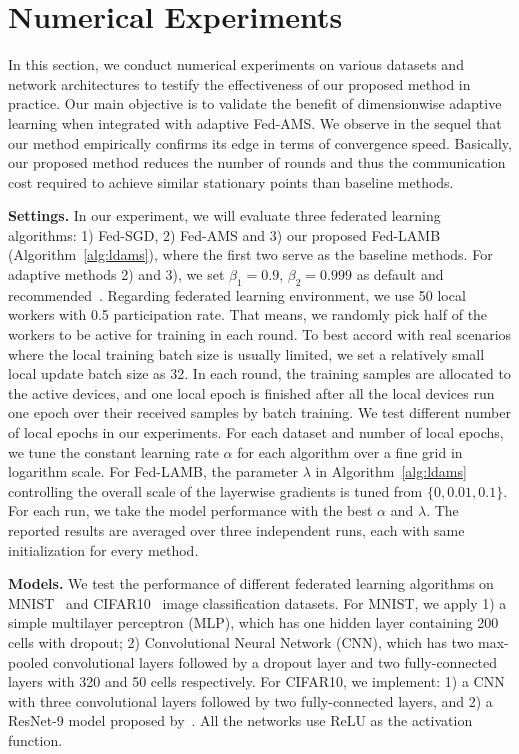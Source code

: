 \documentclass{article}
\begin{document}
\section{Numerical Experiments}\label{sec:numerical}

In this section, we conduct numerical experiments on various datasets and network architectures to testify the effectiveness of our proposed method in practice. Our main objective is to validate the benefit of dimensionwise adaptive learning when integrated with adaptive Fed-AMS.
We observe in the sequel that our method empirically confirms its edge in terms of convergence speed.
Basically, our proposed method reduces the number of rounds and thus the communication cost required to achieve similar stationary points than baseline methods. 

\medskip
\noindent\textbf{Settings.} In our experiment, we will evaluate three federated learning algorithms: 1) Fed-SGD, 2) Fed-AMS and 3) our proposed Fed-LAMB (Algorithm~\ref{alg:ldams}), where the first two serve as the baseline methods. For adaptive methods 2) and 3), we set $\beta_1=0.9$, $\beta_2=0.999$ as default and recommended~\citep{RKK18}. Regarding federated learning environment, we use 50 local workers with 0.5 participation rate. That means, we randomly pick half of the workers to be active for training in each round. To best accord with real scenarios where the local training batch size is usually limited, we set a relatively small local update batch size as 32. In each round, the training samples are allocated to the active devices, and one local epoch is finished after all the local devices run one epoch over their received samples by batch training. We test different number of local epochs in our experiments. For each dataset and number of local epochs, we tune the constant learning rate $\alpha$ for each algorithm over a fine grid in logarithm scale. For Fed-LAMB, the parameter $\lambda$ in Algorithm~\ref{alg:ldams} controlling the overall scale of the layerwise gradients is tuned from $\{0,0.01,0.1\}$. For each run, we take the model performance with the best $\alpha$ and $\lambda$. The reported results are averaged over three independent runs, each with same initialization for every method.

\medskip
\noindent\textbf{Models.} We test the performance of different federated learning algorithms on MNIST~\citep{lecun1998mnist} and CIFAR10~\citep{krizhevsky2009learning} image classification datasets. For MNIST, we apply 1) a simple multilayer perceptron (MLP), which has one hidden layer containing 200 cells with dropout; 2) Convolutional Neural Network (CNN), which has two max-pooled convolutional layers followed by a dropout layer and two fully-connected layers with 320 and 50 cells respectively. For CIFAR10, we implement: 1) a CNN with three convolutional layers followed by two fully-connected layers, and 2) a ResNet-9 model proposed by~\citet{Proc:He-resnet16}. All the networks use ReLU as the activation function.
\end{document}
